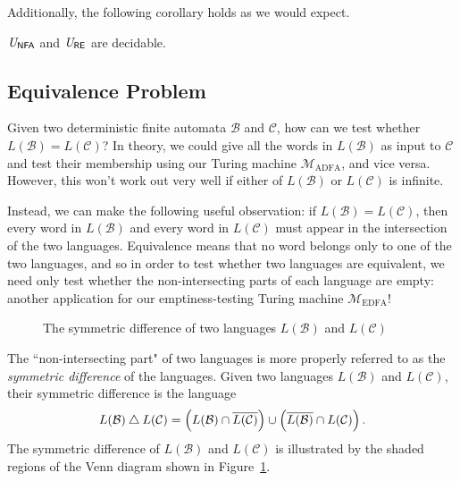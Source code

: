 Additionally, the following corollary holds as we would expect.

\begin{corollary}
$\mathit{U}_{\textsf{NFA}}$ and $\mathit{U}_{\textsf{RE}}$ are decidable.
\end{corollary}

\subsection*{Equivalence Problem}

Given two deterministic finite automata $\mathcal{B}$ and $\mathcal{C}$, how can we test whether $L(\mathcal{B}) = L(\mathcal{C})$? In theory, we could give all the words in $L(\mathcal{B})$ as input to $\mathcal{C}$ and test their membership using our Turing machine $\mathcal{M}_{\mathrm{ADFA}}$, and vice versa. However, this won't work out very well if either of $L(\mathcal{B})$ or $L(\mathcal{C})$ is infinite.

Instead, we can make the following useful observation: if $L(\mathcal{B}) = L(\mathcal{C})$, then every word in $L(\mathcal{B})$ and every word in $L(\mathcal{C})$ must appear in the intersection of the two languages. Equivalence means that no word belongs only to one of the two languages, and so in order to test whether two languages are equivalent, we need only test whether the non-intersecting parts of each language are empty: another application for our emptiness-testing Turing machine $\mathcal{M}_{\mathrm{EDFA}}$!

\begin{figure}
\centering
{}
\caption{The symmetric difference of two languages $L(\mathcal{B})$ and $L(\mathcal{C})$}
\label{fig:symmetricdifference}
\end{figure}

The ``non-intersecting part" of two languages is more properly referred to as the \emph{symmetric difference} of the languages. Given two languages $L(\mathcal{B})$ and $L(\mathcal{C})$, their symmetric difference is the language
\begin{equation*}
L(\mathcal{B}) \mathbin{\triangle} L(\mathcal{C}) = \left( L(\mathcal{B}) \cap \overline{L(\mathcal{C})} \right) \cup \left( \overline{L(\mathcal{B})} \cap L(\mathcal{C}) \right).
\end{equation*}
The symmetric difference of $L(\mathcal{B})$ and $L(\mathcal{C})$ is illustrated by the shaded regions of the Venn diagram shown in Figure~\ref{fig:symmetricdifference}.

